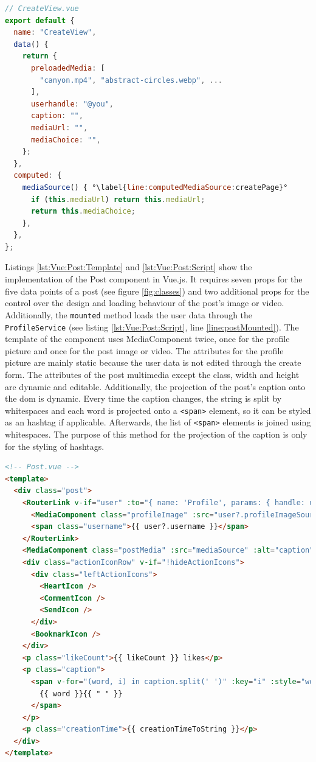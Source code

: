 \documentclass[a4paper, 10pt]{article}
\begin{document}
\begin{lstlisting}[caption=Create Page in Vue.js (Script), label={lst:Vue:Create:Script}, language=JavaScript, firstnumber=25, escapechar=°]
// CreateView.vue
export default {
  name: "CreateView",
  data() {
    return {
      preloadedMedia: [
        "canyon.mp4", "abstract-circles.webp", ...
      ],
      userhandle: "@you",
      caption: "",
      mediaUrl: "",
      mediaChoice: "",
    };
  },
  computed: {
    mediaSource() { °\label{line:computedMediaSource:createPage}°
      if (this.mediaUrl) return this.mediaUrl;
      return this.mediaChoice;
    },
  },
};
\end{lstlisting}
 
Listings \ref{lst:Vue:Post:Template} and \ref{lst:Vue:Post:Script} show the implementation of the Post component in Vue.js.
It requires seven props for the five data points of a post (see figure \ref{fig:classes}) and two additional props for the control over the design and loading behaviour of the post's image or video.
Additionally, the \verb|mounted| method loads the user data through the \verb|ProfileService| (see listing \ref{lst:Vue:Post:Script}, line \ref{line:postMounted}).
The template of the component uses MediaComponent twice, once for the profile picture and once for the post image or video.
The attributes for the profile picture are mainly static because the user data is not edited through the create form.
The attributes of the post multimedia except the class, width and height are dynamic and editable.
Additionally, the projection of the post's caption onto the \acrshort{dom} is dynamic.
Every time the caption changes, the string is split by whitespaces and each word is projected onto a \verb|<span>| element, so it can be styled as an hashtag if applicable.
Afterwards, the list of \verb|<span>| elements is joined using whitespaces.
The purpose of this method for the projection of the caption is only for the styling of hashtags.

\begin{lstlisting}[caption=Post in Vue.js (Template), label={lst:Vue:Post:Template}, language=HTML]
<!-- Post.vue -->
<template>
  <div class="post">
    <RouterLink v-if="user" :to="{ name: 'Profile', params: { handle: userhandle } }" class="postUserInfo" >
      <MediaComponent class="profileImage" :src="user?.profileImageSource" alt="" width="44" height="44" />
      <span class="username">{{ user?.username }}</span>
    </RouterLink>
    <MediaComponent class="postMedia" :src="mediaSource" :alt="caption" width="100%" height="100%" :eagerLoading="eagerLoading" />
    <div class="actionIconRow" v-if="!hideActionIcons">
      <div class="leftActionIcons">
        <HeartIcon />
        <CommentIcon />
        <SendIcon />
      </div>
      <BookmarkIcon />
    </div>
    <p class="likeCount">{{ likeCount }} likes</p>
    <p class="caption">
      <span v-for="(word, i) in caption.split(' ')" :key="i" :style="word.startsWith('#') ? 'color: #0091E2' : ''">
        {{ word }}{{ " " }}
      </span>
    </p>
    <p class="creationTime">{{ creationTimeToString }}</p>
  </div>
</template>
\end{lstlisting}
  
\end{document}

